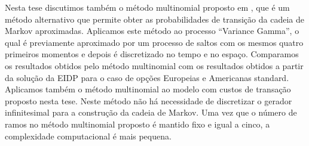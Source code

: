 Nesta tese discutimos também o método multinomial proposto em \cite{YaPr01}, que é um método alternativo que permite obter as probabilidades de transição da cadeia de Markov aproximadas. 
Aplicamos este método ao processo “Variance Gamma”, o qual é previamente aproximado por um processo de saltos com os mesmos quatro primeiros momentos e depois é discretizado 
no tempo e no espaço. 
Comparamos os resultados obtidos pelo método multinomial com os resultados obtidos a partir da solução da EIDP para o caso de opções Europeias e Americanas standard. 
Aplicamos também o método multinomial ao modelo com custos de transação proposto nesta tese. 
Neste método não há necessidade de discretizar o gerador infinitesimal para a construção da cadeia de Markov. 
Uma vez que o número de ramos no método multinomial proposto é mantido fixo e igual a cinco, a complexidade computacional é mais pequena. 